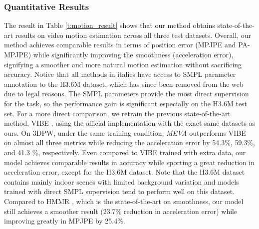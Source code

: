 \documentclass[runningheads]{llncs}
\begin{document}
\begin{table}[!thb]
\caption{\textbf{VAE Reconstruction Test Error on 3DPW dataset} Here, the VAE is tasked to encode and decode unseen motion sequences from the 3DPW dataset, and we calculate our metrics between the ground truth and reconstructed sequences. Motion sequences from different splits of 3DPW have varying difficulties, but are all unseen by our VAE.  }
\label{t:vae_result} 
\centering
{}
\end{table}

\subsubsection{Quantitative Results}


The result in Table \ref{t:motion_result} shows that our method obtains state-of-the-art results on video motion estimation across all three test datasets. 
Overall, our method achieves comparable results in terms of position error (MPJPE and PA-MPJPE) while significantly improving the smoothness (acceleration error), signifying a smoother and more natural motion estimation without sacrificing accuracy. Notice that all methods in italics have access to SMPL parameter annotation to the H3.6M dataset, which has since been removed from the web due to legal reasons. The SMPL parameters provide the most direct supervision for the task, so the performance gain is significant especially on the H3.6M test set. For a more direct comparison, we retrain the previous state-of-the-art method, VIBE \cite{vibe}, using the official implementation with the exact same datasets as ours. On 3DPW, under the same training condition, \textit{MEVA} outperforms VIBE on almost all three metrics while reducing the acceleration error by 54.3\%, 59.3\%, and 41.3 \%, respectively. Even compared to VIBE trained with extra data, our model achieves comparable results in accuracy while sporting a great reduction in acceleration error, except for the H3.6M dataset. Note that the H3.6M dataset contains mainly indoor scenes with limited background variation and models trained with direct SMPL supervision  tend to perform well on this dataset. Compared to HMMR \cite{hmmr}, which is the state-of-the-art on smoothness, our  model still achieves a smoother result (23.7\% reduction in acceleration error) while improving greatly in MPJPE by 25.4\%. 
\end{document}
